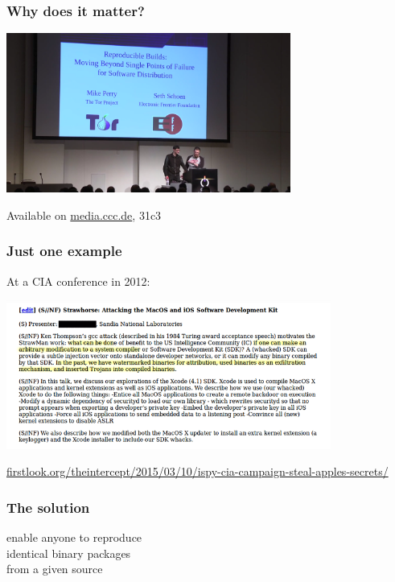 \documentclass[14pt]{beamer}
\begin{document}
\begin{frame}[fragile]
 \frametitle{Why does it matter?}

 \begin{center}
  \includegraphics[width=0.7\textwidth]{images/31c3.png}

  Available on \url{media.ccc.de}, 31c3
 \end{center}
\end{frame}

\begin{frame}[fragile]
 \frametitle{Just one example}

 At a CIA conference in 2012:
 \begin{center}
  \includegraphics[width=0.8\textwidth]{images/strawhorse.png}

  {\footnotesize
  \url{firstlook.org/theintercept/2015/03/10/ispy-cia-campaign-steal-apples-secrets/}
  }
 \end{center}
\end{frame}

\begin{frame}
 \frametitle{The solution}

 \begin{center}
 \Large
 enable anyone to reproduce\\
 identical binary packages\\
 from a given source
\end{center}

\end{frame}
\end{document}
